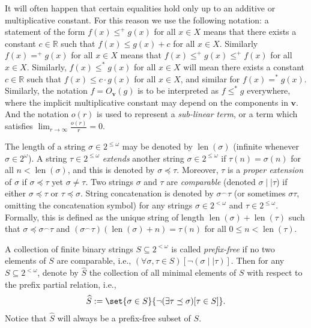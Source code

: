 It will often happen that certain equalities hold only up to an additive or multiplicative constant. For this reason we use the following notation: a statement of the form $f(x) \leq^+ g(x)$ for all $x \in X$ means that there exists a constant $c \in \mathbb{R}$ such that $f(x) \leq g(x) + c$ for all $x \in X$. Similarly $f(x) =^+ g(x)$ for all $x \in X$ means that $f(x) \leq^+ g(x) \leq^+ f(x)$ for all $x \in X$. Similarly, $f(x) \leq^* g(x)$ for all $x \in X$ will mean there exists a constant $c \in \mathbb{R}$ such that $f(x) \leq c \cdot g(x)$ for all $x \in X$, and similar for $f(x) =^* g(x)$. Similarly, the notation $f = O_{\boldsymbol{v}}(g)$ is to be interpreted as $f \leq^* g$ everywhere, where the implicit multiplicative constant may depend on the components in $\boldsymbol{v}$. And the notation $o(r)$ is used to represent a \textit{sub-linear term}, or a term which satisfies $\lim_{r \to \infty} \frac{o(r)}{r} = 0$.

The length of a string $\sigma \in 2^{\leq \omega}$ may be denoted by $\operatorname{len}(\sigma)$ (infinite whenever $\sigma \in 2^\omega$). A string $\tau \in 2^{\leq \omega}$ \textit{extends} another string $\sigma \in 2^{\leq \omega}$ if $\tau(n) = \sigma(n)$ for all $n < \operatorname{len}(\sigma)$, and this is denoted by $\sigma \preceq \tau$. Moreover, $\tau$ is a \textit{proper extension} of $\sigma$ if $\sigma \preceq \tau$ yet $\sigma \neq \tau$. Two strings $\sigma$ and $\tau$ are \textit{comparable} (denoted $\sigma \mid\mid \tau$) if either $\sigma \preceq \tau$ or $\tau \preceq \sigma$. String concatenation is denoted by $\sigma^\smallfrown \tau$ (or sometimes $\sigma \tau$, omitting the concatenation symbol) for any strings $\sigma \in 2^{<\omega}$ and $\tau \in 2^{\leq \omega}$. Formally, this is defined as the unique string of length $\operatorname{len}(\sigma) + \operatorname{len}(\tau)$ such that $\sigma \preceq \sigma^\smallfrown \tau$ and $(\sigma^\smallfrown \tau)(\operatorname{len}(\sigma) + n) = \tau(n)$ for all $0 \leq n < \operatorname{len}(\tau)$. 

A collection of finite binary strings $S \subseteq 2^{<\omega}$ is called \textit{prefix-free} if no two elements of $S$ are comparable, i.e., $(\forall \sigma, \tau \in S)[\neg(\sigma \mid\mid \tau)]$. Then for any $S \subseteq 2^{<\omega}$, denote by $\widehat{S}$ the collection of all minimal elements of $S$ with respect to the prefix partial relation, i.e.,
\begin{align*}
    \widehat{S} := \set{\sigma \in S}{\neg (\exists \tau \preceq \sigma)[\tau \in S]}.
\end{align*}
Notice that $\widehat{S}$ will always be a prefix-free subset of $S$. 


